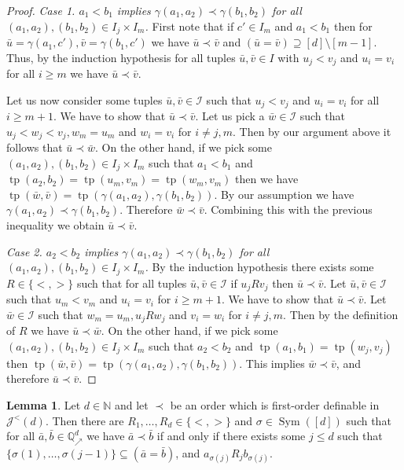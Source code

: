 \documentclass{amsart}
\theoremstyle{definition}
\newtheorem{lemma}[theorem]{Lemma}
\theoremstyle{remark}
\numberwithin{equation}{section}
\newcommand\johnord[1]{\mathcal{J}^{<}(#1)}
\newcommand{\tp}{\operatorname{tp}}
\newcommand{\Sym}{\operatorname{Sym}}
\newcommand\qup[1]{\mathbb{Q}_\nearrow^{#1}}
\begin{document}
\begin{proof}
	\emph{Case 1. $a_1<b_1$ implies $\gamma(a_1,a_2)\prec \gamma(b_1,b_2)$ for all $(a_1,a_2),(b_1,b_2)\in I_j\times I_m$.} First note that if $c'\in I_m$ and $a_1<b_1$ then for $\bar{u}=\gamma(a_1,c'), \bar{v}=\gamma({b_1},c')$ we have $\bar{u}\prec \bar{v}$ and $(\bar{u}=\bar{v})\supseteq [d]\setminus [m-1]$. Thus, by the induction hypothesis for all tuples $\bar{u},\bar{v}\in I$ with $u_j<v_j$ and $u_i=v_i$ for all $i\geq m$ we have $\bar{u}\prec \bar{v}$.

	Let us now consider some tuples $\bar{u},\bar{v}\in {\mathcal{I}}$ such that $u_j<v_j$ and $u_i=v_i$ for all $i\geq m+1$. We have to show that $\bar{u}\prec \bar{v}$. Let us pick a $\bar{w}\in {\mathcal{I}}$ such that $u_j<w_j<v_j, w_m=u_m$ and $w_i=v_i$ for $i\neq j,m$.	Then by our argument above it follows that $\bar{u}\prec \bar{w}$. On the other hand, if we pick some $(a_1,a_2),(b_1,b_2)\in I_j\times I_m$ such that $a_1<b_1$ and $\tp(a_2,b_2)=\tp(u_m,v_m)=\tp(w_m,v_m)$ then we have $\tp(\bar{w},\bar{v})=\tp(\gamma(a_1,a_2),\gamma(b_1,b_2))$. By our assumption we have $\gamma(a_1,a_2)\prec\gamma(b_1,b_2)$. Therefore $\bar{w}\prec \bar{v}$. Combining this with the previous inequality we obtain $\bar{u}\prec \bar{v}$.

	\emph{Case 2. $a_2<b_2$ implies $\gamma(a_1,a_2)\prec \gamma(b_1,b_2)$ for all $(a_1,a_2),(b_1,b_2)\in I_j\times I_m$.} By the induction hypothesis there exists some $R\in \{<,>\}$ such that for all tuples $\bar{u},\bar{v}\in {\mathcal{I}}$ if $u_jRv_j$ then $\bar{u}\prec \bar{v}$. Let $\bar{u},\bar{v}\in {\mathcal{I}}$ such that $u_m<v_m$ and $u_i=v_i$ for $i\geq m+1$. We have to show that $\bar{u}\prec \bar{v}$. Let $\bar{w}\in {\mathcal{I}}$ such that $w_m=u_m, u_jRw_j$ and $v_i=w_i$ for $i\neq j,m$. Then by the definition of $R$ we have $\bar{u}\prec \bar{w}$. On the other hand, if we pick some $(a_1,a_2),(b_1,b_2)\in I_j\times I_m$ such that {$a_2<b_2$ and $\tp(a_1,b_1)=\tp(w_j,v_j)$} then $\tp(\bar{w},\bar{v})=\tp(\gamma({a_1,a_2}),\gamma({b_1,b_2}))$. This implies $\bar{w}\prec \bar{v}$, and therefore $\bar{u}\prec \bar{v}$.
\end{proof}

\begin{lemma}\label{lexicographic}
	Let $d\in \mathbb{N}$ and let $\prec$ be an order which is first-order definable in $\johnord{d}$. Then there are  $R_1,\dots,R_d\in \{<,>\}$ and $\sigma \in \Sym([d])$ such that for all $\bar{a},\bar{b}\in \qup{d}$ we have $\bar{a}\prec \bar{b}$ if and only if there exists some $j\leq d$ such that 
    $\{\sigma(1),\dots,\sigma({j-1})\} \subseteq (\bar{a}=\bar{b})$, and $a_{\sigma(j)}R_jb_{\sigma(j)}$.
\end{lemma}
\end{document}
